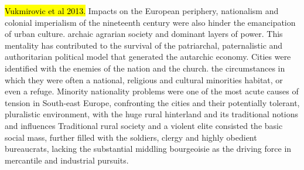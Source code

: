 \documentclass[11pt]{report}
\begin{document}
\hl{Vukmirovic et al 2013.}
Impacts on the European periphery, nationalism and colonial imperialism of the nineteenth century were also hinder the emancipation of urban culture.
archaic agrarian society and dominant layers of power. This mentality has contributed to the survival of the 
patriarchal, paternalistic and authoritarian political model that generated the autarchic economy.
Cities were identified with the enemies of the nation and the church.
the circumstances in which they were often a national, religious and cultural minorities habitat, or even a refuge. Minority  nationality  problems  were  one  of  the  most  acute  causes  of  tension  in  South-east  Europe, confronting the cities and their potentially tolerant, pluralistic environment, with the huge rural hinterland and its traditional notions and influences
Traditional rural society and a violent elite consisted the basic social mass, further filled with the soldiers, clergy and highly obedient 
bureaucrats, lacking the substantial middling bourgeoisie as the driving force in  mercantile and industrial pursuits. 
\end{document}
